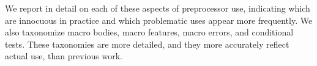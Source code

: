 \documentclass[10pt]{article}
\def\numpackages{26}
\begin{document}
We report in detail on each of these aspects of preprocessor use,
indicating which are innocuous in practice and which problematic uses
appear more frequently.  We also taxonomize macro bodies, macro features,
macro errors, and conditional tests.  These taxonomies are more detailed,
and they more accurately reflect actual use, than previous work.





% 
% 
% 
% 
% 
\end{document}
